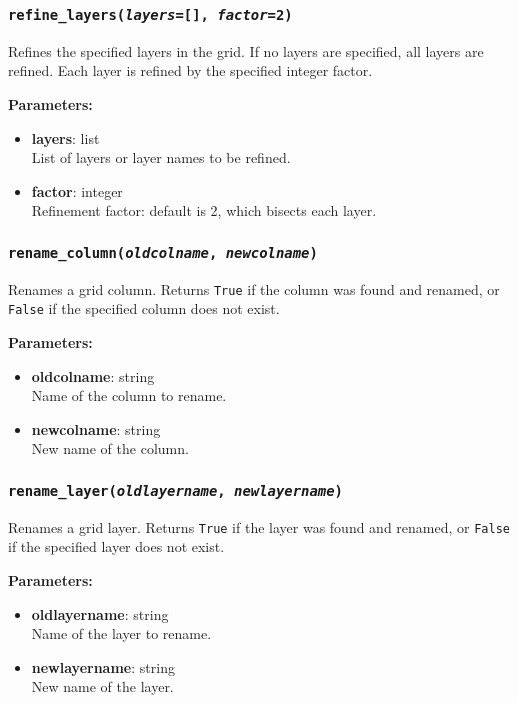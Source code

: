 \subsubsection{\texttt{refine\_layers(\emph{layers}=[], \emph{factor}=2)}}

Refines the specified layers in the grid.  If no layers are specified, all layers are refined.  Each layer is refined by the specified integer factor.

\textbf{Parameters:}
\begin{itemize}
  \item \textbf{layers}: list\\
    List of layers or layer names to be refined.
  \item \textbf{factor}: integer\\
    Refinement factor: default is 2, which bisects each layer.
\end{itemize}

\subsubsection{\texttt{rename\_column(\emph{oldcolname}, \emph{newcolname})}}

Renames a grid column.  Returns \texttt{True} if the column was found and renamed, or \texttt{False} if the specified column does not exist.

\textbf{Parameters:}
\begin{itemize}
  \item \textbf{oldcolname}: string\\
    Name of the column to rename.
  \item \textbf{newcolname}: string\\
    New name of the column.
\end{itemize}

\subsubsection{\texttt{rename\_layer(\emph{oldlayername}, \emph{newlayername})}}

Renames a grid layer.  Returns \texttt{True} if the layer was found and renamed, or \texttt{False} if the specified layer does not exist.

\textbf{Parameters:}
\begin{itemize}
  \item \textbf{oldlayername}: string\\
    Name of the layer to rename.
  \item \textbf{newlayername}: string\\
    New name of the layer.
\end{itemize}

